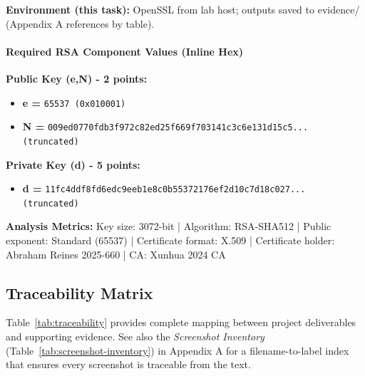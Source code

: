 \noindent\textbf{Environment (this task):} OpenSSL from lab host; outputs saved to evidence/ (Appendix A references by table).

\paragraph{Required RSA Component Values (Inline Hex)}

\textbf{Public Key (e,N) - 2 points:}
\begin{itemize}[nosep]
\item \textbf{e =} \texttt{65537 (0x010001)}
\item \textbf{N =} \texttt{\footnotesize 009ed0770fdb3f972c82ed25f669f703141c3c6e131d15c5... (truncated)}
\end{itemize}

\textbf{Private Key (d) - 5 points:}
\begin{itemize}[nosep]
\item \textbf{d =} \texttt{\footnotesize 11fc4ddf8fd6edc9eeb1e8c0b55372176ef2d10c7d18c027... (truncated)}
\end{itemize}

\noindent\textbf{Analysis Metrics:} Key size: 3072-bit | Algorithm: RSA-SHA512 | Public exponent: Standard (65537) | Certificate format: X.509 | Certificate holder: Abraham Reines 2025-660 | CA: Xunhua 2024 CA

\subsection{Traceability Matrix}

Table~\ref{tab:traceability} provides complete mapping between project deliverables and supporting evidence. See also the \textit{Screenshot Inventory} (Table~\ref{tab:screenshot-inventory}) in Appendix A for a filename-to-label index that ensures every screenshot is traceable from the text.

